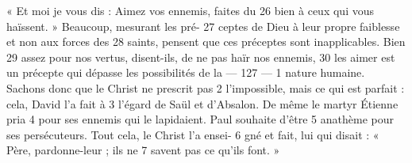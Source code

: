 « Et moi je vous dis : Aimez vos ennemis, faites du	 
26	 	bien à ceux qui vous haïssent. » Beaucoup, mesurant les pré-	 
27	 	ceptes de Dieu à leur propre faiblesse et non aux forces des	 
28	 	saints, pensent que ces préceptes sont inapplicables. Bien	 
29	 	assez pour nos vertus, disent-ils, de ne pas haïr nos ennemis,	 
30	 	les aimer est un précepte qui dépasse les possibilités de la	 
 	--- 127 ---	 
1	 	nature humaine. Sachons donc que le Christ ne prescrit pas	 
2	 	l'impossible, mais ce qui est parfait : cela, David l'a fait à	 
3	 	l'égard de Saül et d'Absalon. De même le martyr Étienne pria	 
4	 	pour ses ennemis qui le lapidaient. Paul souhaite d'être	 
5	 	anathème pour ses persécuteurs. Tout cela, le Christ l'a ensei-	 
6	 	gné et fait, lui qui disait : « Père, pardonne-leur ; ils ne	 
7	 	savent pas ce qu'ils font. »